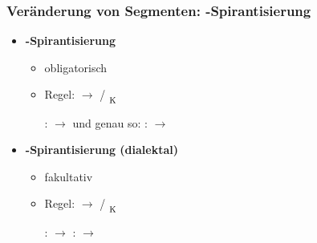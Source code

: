 \begin{frame}
\frametitle{Veränderung von Segmenten: -Spirantisierung}

\begin{itemize}
	\item \textbf{-Spirantisierung}
	
	\begin{itemize}
		\item obligatorisch
		\item Regel:  $\rightarrow$ \textipa{[\c{c}]} / \textipa{[I]} \underline{\quad}$_{\textsubscript{K}}$
		
		\eal
			\ex {}:  $\rightarrow$  und genau so: 
			\ex {}:  $\rightarrow$ 
		\zl
		
	\end{itemize}

	\item \textbf{-Spirantisierung (dialektal)}

	\begin{itemize}
		\item fakultativ
		\item Regel:  $\rightarrow$  / \underline{\quad}$_{\textsubscript{K}}$

\eal	
	\ex {}:  $\rightarrow$ \textipa{[za:\alertred{x}st]}
	\ex {}: $\rightarrow$ \textipa{[le:\alertred{\c{c}}st]}
\zl

	\end{itemize}
\end{itemize}

\end{frame}


